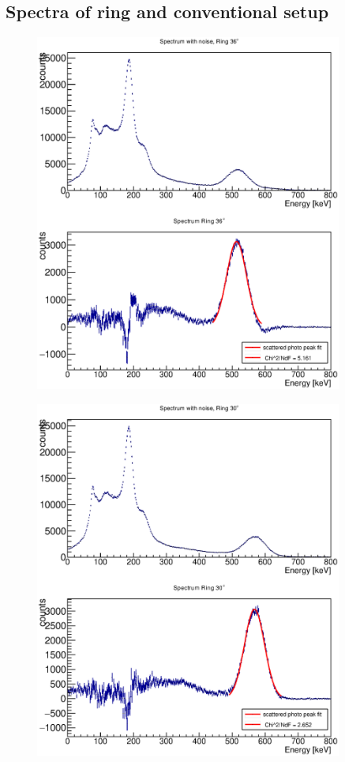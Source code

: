 \documentclass{article}
\begin{document}
\subsection{Spectra of ring and conventional setup}
\begin{figure}[H]
    \centering
    \includegraphics[width=0.9\textwidth]{Graphen/compton_spektren/36grad.eps}
    \caption{}
\end{figure}
\begin{figure}[H]
    \centering
    \includegraphics[width=0.9\textwidth]{Graphen/compton_spektren/30grad.eps}
    \caption{}
\end{figure}
\end{document}
